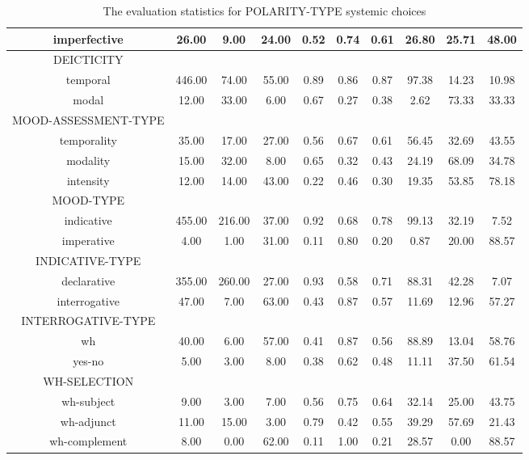 \begin{table}[!ht]
{\begin{tabular}{|c|c|c|c|c|c|c|c|c|c|}
            imperfective & 26.00  & 9.00  & 24.00  & 0.52 & 0.74 & 0.61 & 26.80 & 25.71 & 48.00 \\ \hline
            DEICTICITY &  &  &  &  &  &  &  &  &  \\ \hline            
            temporal & 446.00 & 74.00 & 55.00 & 0.89 & 0.86 & 0.87 & 97.38 & 14.23 & 10.98 \\ \hline
            modal    & 12.00  & 33.00 & 6.00  & 0.67 & 0.27 & 0.38 & 2.62  & 73.33 & 33.33 \\ \hline
            MOOD-ASSESSMENT-TYPE  &  &  &  &  &  &  &  &  &  \\ \hline            
            temporality & 35.00 & 17.00 & 27.00 & 0.56 & 0.67 & 0.61 & 56.45 & 32.69 & 43.55 \\ \hline
            modality    & 15.00 & 32.00 & 8.00  & 0.65 & 0.32 & 0.43 & 24.19 & 68.09 & 34.78 \\ \hline
            intensity   & 12.00 & 14.00 & 43.00 & 0.22 & 0.46 & 0.30 & 19.35 & 53.85 & 78.18 \\ \hline
            MOOD-TYPE  &  &  &  &  &  &  &  &  &  \\ \hline                        
            indicative    & 455.00 & 216.00 & 37.00 & 0.92 & 0.68 & 0.78 & 99.13 & 32.19 & 7.52  \\ \hline
            imperative    & 4.00   & 1.00   & 31.00 & 0.11 & 0.80 & 0.20 & 0.87  & 20.00 & 88.57 \\ \hline
            INDICATIVE-TYPE  &  &  &  &  &  &  &  &  &  \\ \hline                        
            declarative   & 355.00 & 260.00 & 27.00 & 0.93 & 0.58 & 0.71 & 88.31 & 42.28 & 7.07  \\ \hline
            interrogative & 47.00  & 7.00   & 63.00 & 0.43 & 0.87 & 0.57 & 11.69 & 12.96 & 57.27 \\ \hline
            INTERROGATIVE-TYPE  &  &  &  &  &  &  &  &  &  \\ \hline   
             wh            & 40.00  & 6.00   & 57.00 & 0.41 & 0.87 & 0.56 & 88.89 & 13.04 & 58.76 \\ \hline
            yes-no        & 5.00   & 3.00   & 8.00  & 0.38 & 0.62 & 0.48 & 11.11 & 37.50 & 61.54 \\ \hline                     
            WH-SELECTION  &  &  &  &  &  &  &  &  &  \\ \hline                        
            wh-subject    & 9.00   & 3.00   & 7.00  & 0.56 & 0.75 & 0.64 & 32.14 & 25.00 & 43.75 \\ \hline
            wh-adjunct    & 11.00  & 15.00  & 3.00  & 0.79 & 0.42 & 0.55 & 39.29 & 57.69 & 21.43 \\ \hline
            wh-complement & 8.00   & 0.00   & 62.00 & 0.11 & 1.00 & 0.21 & 28.57 & 0.00  & 88.57 \\ \hline
        \end{tabular}
    }
    \caption{The evaluation statistics for POLARITY-TYPE systemic choices}
    \label{tab:features-mood}
\end{table}

